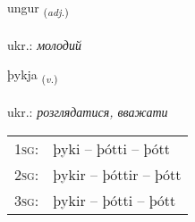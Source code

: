 \documentclass[frontgrid, backgrid]{flacards}\usepackage[]{graphicx}\usepackage[]{xcolor}
\begin{document}
\renewcommand{\blhead}{\vskip5pt {\small\bfseries\footnotesize Lýsingarorð | прикметник }}
\renewcommand{\bcfoot}{\vskip5pt \hspace{2pt}{\small\bfseries\footnotesize 1K}}


{ungur \small{\textsubscript{(\textit{adj.})}} \\[1ex] %
\textphonetic{[uŋkʏr]} \\
ukr.: \emph{молодий} \\  [2ex]
\renewcommand*{\arraystretch}{0.8}
}

\renewcommand{\flhead}{\vskip5pt \fboxsep=0pt {\small\bfseries\footnotesize Sagnorð | дієслово}}
\renewcommand{\fcfoot}{\vskip5pt \fboxsep=0pt \hspace{2pt}{\small\bfseries\footnotesize 1K}}

\renewcommand{\blhead}{\vskip5pt {\small\bfseries\footnotesize Sagnorð | дієслово }}
\renewcommand{\bcfoot}{\vskip5pt \hspace{2pt}{\small\bfseries\footnotesize 1K}}


{þykja \small{\textsubscript{(\textit{v.})}} \\[1ex] %
\textphonetic{[θɪːca]} \\
ukr.: \emph{розглядатися, вважати} \\  [2ex]
\renewcommand*{\arraystretch}{0.8}
\begin{tabular}{p{1cm}l}
\textsc{1sg}: & þyki -- þótti -- þótt \\ 
\textsc{2sg}: & þykir -- þóttir -- þótt \\ 
\textsc{3sg}: & þykir -- þótti -- þótt \\ 
\end{tabular}
}
\end{document}
